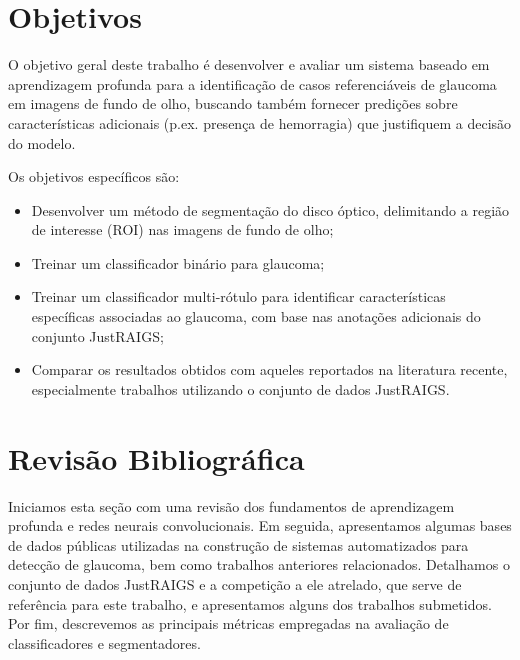 \documentclass[12pt]{article}
\begin{document}
\bigskip

\section{Objetivos}
\label{sec:objetivo}

O objetivo geral deste trabalho é desenvolver e avaliar um sistema baseado em aprendizagem profunda para a identificação de casos referenciáveis de glaucoma em imagens de fundo de olho, 
buscando também fornecer predições sobre características adicionais (p.ex. presença de hemorragia) que justifiquem a decisão do modelo.

Os objetivos específicos são:
\begin{itemize}
    \item Desenvolver um método de segmentação do disco óptico, delimitando a região de interesse (ROI) nas imagens de fundo de olho;
    \item Treinar um classificador binário para glaucoma;
    \item Treinar um classificador multi-rótulo para identificar características específicas associadas ao glaucoma, com base nas anotações adicionais do conjunto JustRAIGS;
    \item Comparar os resultados obtidos com aqueles reportados na literatura recente, especialmente trabalhos utilizando o conjunto de dados JustRAIGS.
\end{itemize}

\bigskip

\section{Revisão Bibliográfica}
\label{sec:review}

Iniciamos esta seção com uma revisão dos fundamentos de aprendizagem profunda e redes neurais convolucionais. Em seguida, apresentamos algumas bases de dados públicas utilizadas na construção de sistemas automatizados para detecção de glaucoma, bem como trabalhos anteriores relacionados. Detalhamos o conjunto de dados JustRAIGS e a competição a ele atrelado, que serve de referência para este trabalho, e apresentamos alguns dos trabalhos submetidos. Por fim, descrevemos as principais métricas empregadas na avaliação de classificadores e segmentadores.
\end{document}
